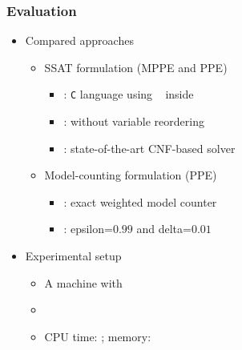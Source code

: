 \newcommand{\ncircuit}{\num{30}}

\begin{frame}
    \frametitle{Evaluation}
    \begin{itemize}
        \item Compared approaches
              \pause
              \begin{itemize}
                  \item SSAT formulation (MPPE and PPE)
                        \pause
                        \begin{itemize}
                            \item \bddsp: \texttt{C} language using \cudd~\cite{CUDD} inside \abc~\cite{ABC}
                                  \pause
                            \item \bddspnr: \bddsp without variable reordering
                                  \pause
                            \item \dcssat: state-of-the-art CNF-based solver
                                  \pause
                        \end{itemize}
                  \item Model-counting formulation (PPE)
                        \pause
                        \begin{itemize}
                            \item \cachet: exact weighted model counter
                                  \pause
                            \item \approxmc: epsilon=$0.99$ and delta=$0.01$
                                  \pause
                        \end{itemize}
              \end{itemize}
        \item Experimental setup
              \pause
              \begin{itemize}
                  \item A machine with~\machineSpec
                        \pause
                  \item \osInfo
                        \pause
                  \item CPU time: \timelimit; memory: \memlimit
              \end{itemize}
    \end{itemize}
\end{frame}

